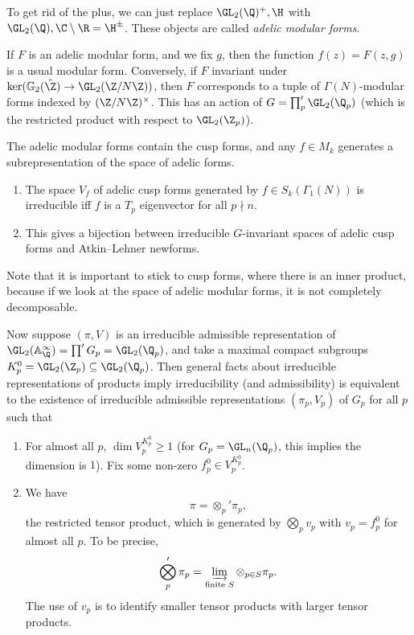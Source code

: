 \documentclass[a4paper]{article}
\renewcommand\G{\mathbb{G}}
\newcommand\A{\mathbb{A}}
\begin{document}
To get rid of the plus, we can just replace $\GL_2(\Q)^+, \H$ with $\GL_2(\Q), \C \setminus \R = \H^{\pm}$. These objects are called \emph{adelic modular forms}.

If $F$ is an adelic modular form, and we fix $g$, then the function $f(z) = F(z, g)$ is a usual modular form. Conversely, if $F$ invariant under $\ker (\G_2(\hat{\Z}) \to \GL_2(\Z/N\Z))$, then $F$ corresponds to a tuple of $\Gamma(N)$-modular forms indexed by $(\Z/N\Z)^\times$. This has an action of $G = \prod_p ' \GL_2(\Q_p)$ (which is the restricted product with respect to $\GL_2(\Z_p)$).

The adelic modular forms contain the cusp forms, and any $f \in M_k$ generates a subrepresentation of the space of adelic forms.

\begin{thm}\leavevmode
  \begin{enumerate}
    \item The space $V_f$ of adelic cusp forms generated by $f \in S_k(\Gamma_1(N))$ is irreducible iff $f$ is a $T_p$ eigenvector for all $p \nmid n$.
    \item This gives a bijection between irreducible $G$-invariant spaces of adelic cusp forms and Atkin--Lehner newforms.
  \end{enumerate}
\end{thm}
Note that it is important to stick to cusp forms, where there is an inner product, because if we look at the space of adelic modular forms, it is not completely decomposable.

Now suppose $(\pi, V)$ is an irreducible admissible representation of $\GL_2(\A_\Q^\infty) = \prod' G_p = \GL_2(\Q_p)$, and take a maximal compact subgroups $K_p^0 = \GL_2(\Z_p) \subseteq \GL_2(\Q_p)$. Then general facts about irreducible representations of products imply irreducibility (and admissibility) is equivalent to the existence of irreducible admissible representations $(\pi_p, V_p)$ of $G_p$ for all $p$ such that
\begin{enumerate}
  \item For almost all $p$, $\dim V_p^{K_p^0} \geq 1$ (for $G_p = \GL_n(\Q_p)$, this implies the dimension is $1$). Fix some non-zero $f_p^0 \in V_p^{K_p^0}$.
  \item We have
    \[
      \pi = \otimes_p' \pi_p,
    \]
    the restricted tensor product, which is generated by $\bigotimes_p v_p$ with $v_p = f_p^0$ for almost all $p$. To be precise,
    \[
      \bigotimes_p' \pi_p = \varinjlim_{\text{finite }S} \otimes_{p \in S} \pi_p.
    \]
    The use of $v_p$ is to identify smaller tensor products with larger tensor products.
\end{enumerate}
\end{document}
